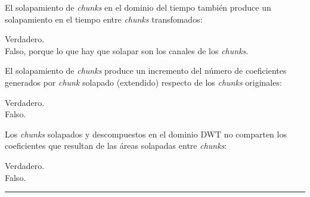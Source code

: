 \documentclass[legalpaper, 12pt, addpoints]{exam}
\begin{document}
\begin{questions}
\vspace{0.10in}

\question El solapamiento de \emph{chunks} en el dominio del tiempo
también produce un solapamiento en el tiempo entre \emph{chunks}
transfomados:

\begin{oneparchoices}
  \choice Verdadero.\\
  \choice Falso, porque lo que hay que solapar son los canales de los \emph{chunks}.
\end{oneparchoices}
  
\vspace{0.10in}

\question El solapamiento de \emph{chunks} produce un incremento del
número de coeficientes generados por \emph{chunk} solapado (extendido)
respecto de los \emph{chunks} originales:

\begin{oneparchoices}
  \choice Verdadero.\\
  \choice Falso.
\end{oneparchoices}
  
\vspace{0.10in}

\question Los \emph{chunks} solapados y descompuestos en el dominio DWT no comparten los
coeficientes que resultan de las áreas solapadas entre \emph{chunks}:

\begin{oneparchoices}
  \choice Verdadero.\\
  \choice Falso.
\end{oneparchoices}
  
\vspace{0.10in}

\hrule

\end{questions}
\end{document}
